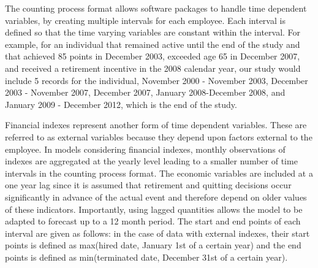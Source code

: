 \documentclass[12pt,letterpaper]{article}
\begin{document}
The counting process format allows software packages to handle time dependent variables, by creating multiple intervals for each employee.  Each interval is defined so that the time varying variables are constant within the interval.
For example, for an individual that remained active until the end of the study and that achieved 85 points in December 2003, exceeded age 65 in December 2007, and received a retirement incentive in the 2008 calendar year, our study would include 5 records for the individual, November 2000 - November 2003, December 2003 - November 2007, December 2007, January 2008-December 2008, and January 2009 - December 2012, which is the end of the study.

Financial indexes represent another form of time dependent variables. These are referred to as external variables because they depend upon factors external to the employee. In models considering financial indexes, monthly observations of indexes are aggregated at the yearly level leading to a smaller number of time intervals in the counting process format.  The economic variables are included at a one year lag since it is assumed that retirement and quitting decisions occur significantly in advance of the actual event and therefore depend on older values of these indicators. Importantly, using lagged quantities allows the model to be adapted to forecast up to a 12 month period. 
The start and end points of each interval are given as follows: in the case of data with external indexes, their start points is defined as max(hired date, January 1st of a certain year) and the end points is defined as min(terminated date, December 31st of a certain year).
\end{document}
